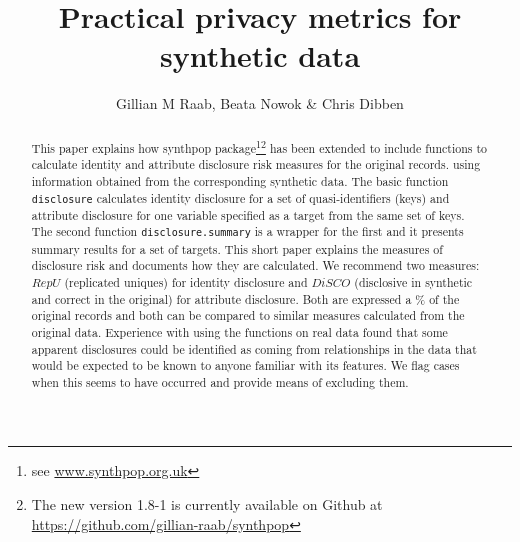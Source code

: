 \documentclass[12pt]{article}
\title{Practical privacy metrics for synthetic data}
\author{Gillian M Raab, Beata Nowok \& Chris Dibben}
\begin{document}



\maketitle
\begin{abstract}
This paper explains how synthpop package\footnote{see \url{www.synthpop.org.uk} }\footnote{The new version 1.8-1 is currently available on Github at \url{https://github.com/gillian-raab/synthpop}} has been extended to include functions to calculate identity and attribute disclosure risk measures for the original records. using information obtained from the corresponding synthetic data. The basic function \texttt{disclosure} calculates identity disclosure for a set of quasi-identifiers (keys) and attribute disclosure for one variable specified as a target from the same set of keys. The second function \texttt{disclosure.summary} is a wrapper for the first and it presents summary results for a set of targets. This short paper explains the measures of disclosure risk and documents how they are calculated. We recommend two measures: $RepU$ (replicated uniques) for identity
disclosure and $DiSCO$ (disclosive in synthetic and correct in the original) for attribute disclosure. Both
are expressed a \% of the original records and both can be compared to similar measures calculated from the original data.
Experience with using the functions on real data found that some apparent disclosures could be identified as coming from relationships 
in the data that would be expected to be known to anyone familiar with its features. We flag cases when this seems to have occurred and provide means of excluding them.

\end{abstract}
\end{document}
